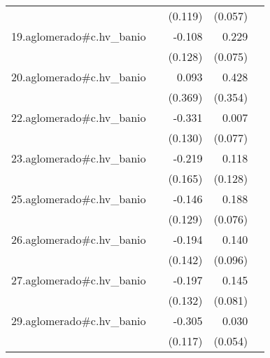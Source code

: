 {\begin{longtable}{l*{4}{D{.}{.}{-1}}}
            &                     &     (0.119)         &     (0.057)         &                     \\
\addlinespace
19.aglomerado#c.hv\_banio&                     &      -0.108         &       0.229\sym{**} &                     \\
            &                     &     (0.128)         &     (0.075)         &                     \\
\addlinespace
20.aglomerado#c.hv\_banio&                     &       0.093         &       0.428         &                     \\
            &                     &     (0.369)         &     (0.354)         &                     \\
\addlinespace
22.aglomerado#c.hv\_banio&                     &      -0.331\sym{*}  &       0.007         &                     \\
            &                     &     (0.130)         &     (0.077)         &                     \\
\addlinespace
23.aglomerado#c.hv\_banio&                     &      -0.219         &       0.118         &                     \\
            &                     &     (0.165)         &     (0.128)         &                     \\
\addlinespace
25.aglomerado#c.hv\_banio&                     &      -0.146         &       0.188\sym{*}  &                     \\
            &                     &     (0.129)         &     (0.076)         &                     \\
\addlinespace
26.aglomerado#c.hv\_banio&                     &      -0.194         &       0.140         &                     \\
            &                     &     (0.142)         &     (0.096)         &                     \\
\addlinespace
27.aglomerado#c.hv\_banio&                     &      -0.197         &       0.145         &                     \\
            &                     &     (0.132)         &     (0.081)         &                     \\
\addlinespace
29.aglomerado#c.hv\_banio&                     &      -0.305\sym{**} &       0.030         &                     \\
            &                     &     (0.117)         &     (0.054)         &                     \\

\end{longtable}}
